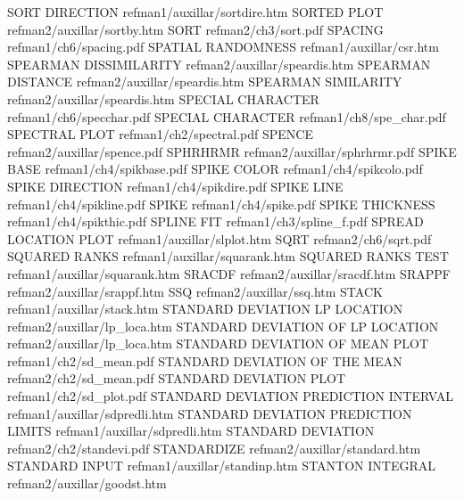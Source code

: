 SORT DIRECTION                          refman1/auxillar/sortdire.htm
SORTED PLOT                             refman2/auxillar/sortby.htm
SORT                                    refman2/ch3/sort.pdf
SPACING                                 refman1/ch6/spacing.pdf
SPATIAL RANDOMNESS                      refman1/auxillar/csr.htm
SPEARMAN DISSIMILARITY                  refman2/auxillar/speardis.htm
SPEARMAN DISTANCE                       refman2/auxillar/speardis.htm
SPEARMAN SIMILARITY                     refman2/auxillar/speardis.htm
SPECIAL CHARACTER                       refman1/ch6/specchar.pdf
SPECIAL CHARACTER                       refman1/ch8/spe_char.pdf
SPECTRAL PLOT                           refman1/ch2/spectral.pdf
SPENCE                                  refman2/auxillar/spence.pdf
SPHRHRMR                                refman2/auxillar/sphrhrmr.pdf
SPIKE BASE                              refman1/ch4/spikbase.pdf
SPIKE COLOR                             refman1/ch4/spikcolo.pdf
SPIKE DIRECTION                         refman1/ch4/spikdire.pdf
SPIKE LINE                              refman1/ch4/spikline.pdf
SPIKE                                   refman1/ch4/spike.pdf
SPIKE THICKNESS                         refman1/ch4/spikthic.pdf
SPLINE FIT                              refman1/ch3/spline_f.pdf
SPREAD LOCATION PLOT                    refman1/auxillar/slplot.htm
SQRT                                    refman2/ch6/sqrt.pdf
SQUARED RANKS                           refman1/auxillar/squarank.htm
SQUARED RANKS TEST                      refman1/auxillar/squarank.htm
SRACDF                                  refman2/auxillar/sracdf.htm
SRAPPF                                  refman2/auxillar/srappf.htm
SSQ                                     refman2/auxillar/ssq.htm
STACK                                   refman1/auxillar/stack.htm
STANDARD DEVIATION LP LOCATION          refman2/auxillar/lp_loca.htm
STANDARD DEVIATION OF LP LOCATION       refman2/auxillar/lp_loca.htm
STANDARD DEVIATION OF MEAN PLOT         refman1/ch2/sd_mean.pdf
STANDARD DEVIATION OF THE MEAN          refman2/ch2/sd_mean.pdf
STANDARD DEVIATION PLOT                 refman1/ch2/sd_plot.pdf
STANDARD DEVIATION PREDICTION INTERVAL  refman1/auxillar/sdpredli.htm
STANDARD DEVIATION PREDICTION LIMITS    refman1/auxillar/sdpredli.htm
STANDARD DEVIATION                      refman2/ch2/standevi.pdf
STANDARDIZE                             refman2/auxillar/standard.htm
STANDARD INPUT                          refman1/auxillar/standinp.htm
STANTON INTEGRAL                        refman2/auxillar/goodst.htm
